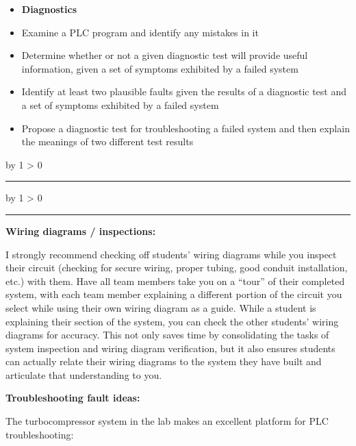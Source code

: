 \documentclass[12pt,a4paper]{article}
\def\svar{
           \advance\answnum by 1
           \ifnum \answnum > 0
                \hrule
                \vskip 3pt
                \leftline{Svar \the\answnum}
                \vskip 3pt \fi}
\def\notes{
           \advance\explnum by 1
           \ifnum \explnum > 0
                \hrule
                \vskip 3pt
                \leftline{Notes \the\explnum}
                \vskip 3pt \fi}
\begin{document}
\begin{itemize}
\filbreak

\begin{itemize}
\item{} {\bf Diagnostics}
\item{} Examine a PLC program and identify any mistakes in it
\item{} Determine whether or not a given diagnostic test will provide useful information, given a set of symptoms exhibited by a failed system
\item{} Identify at least two plausible faults given the results of a diagnostic test and a set of symptoms exhibited by a failed system
\item{} Propose a diagnostic test for troubleshooting a failed system and then explain the meanings of two different test results
\end{itemize}


\vskip 10pt \filbreak 





\svar{} 


\vskip 10pt \filbreak 





\notes{} 

\noindent
{\bf Wiring diagrams / inspections:}

I strongly recommend checking off students' wiring diagrams while you inspect their circuit (checking for secure wiring, proper tubing, good conduit installation, etc.) with them.  Have all team members take you on a ``tour'' of their completed system, with each team member explaining a different portion of the circuit you select while using their own wiring diagram as a guide.  While a student is explaining their section of the system, you can check the other students' wiring diagrams for accuracy.  This not only saves time by consolidating the tasks of system inspection and wiring diagram verification, but it also ensures students can actually relate their wiring diagrams to the system they have built and articulate that understanding to you.

\vskip 10pt

\goodbreak

\noindent
{\bf Troubleshooting fault ideas:}

The turbocompressor system in the lab makes an excellent platform for PLC troubleshooting:


\end{itemize}
\end{document}
